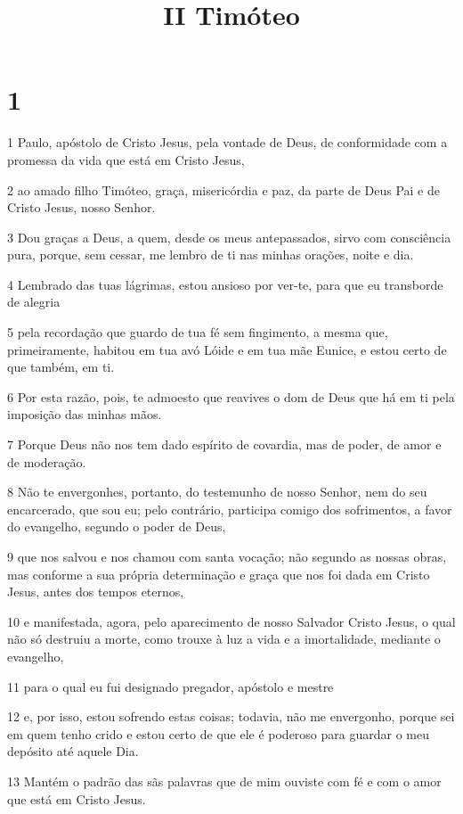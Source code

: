

\title{II Timóteo}


\chapter{1}

\par 1 Paulo, apóstolo de Cristo Jesus, pela vontade de Deus, de conformidade com a promessa da vida que está em Cristo Jesus,
\par 2 ao amado filho Timóteo, graça, misericórdia e paz, da parte de Deus Pai e de Cristo Jesus, nosso Senhor.
\par 3 Dou graças a Deus, a quem, desde os meus antepassados, sirvo com consciência pura, porque, sem cessar, me lembro de ti nas minhas orações, noite e dia.
\par 4 Lembrado das tuas lágrimas, estou ansioso por ver-te, para que eu transborde de alegria
\par 5 pela recordação que guardo de tua fé sem fingimento, a mesma que, primeiramente, habitou em tua avó Lóide e em tua mãe Eunice, e estou certo de que também, em ti.
\par 6 Por esta razão, pois, te admoesto que reavives o dom de Deus que há em ti pela imposição das minhas mãos.
\par 7 Porque Deus não nos tem dado espírito de covardia, mas de poder, de amor e de moderação.
\par 8 Não te envergonhes, portanto, do testemunho de nosso Senhor, nem do seu encarcerado, que sou eu; pelo contrário, participa comigo dos sofrimentos, a favor do evangelho, segundo o poder de Deus,
\par 9 que nos salvou e nos chamou com santa vocação; não segundo as nossas obras, mas conforme a sua própria determinação e graça que nos foi dada em Cristo Jesus, antes dos tempos eternos,
\par 10 e manifestada, agora, pelo aparecimento de nosso Salvador Cristo Jesus, o qual não só destruiu a morte, como trouxe à luz a vida e a imortalidade, mediante o evangelho,
\par 11 para o qual eu fui designado pregador, apóstolo e mestre
\par 12 e, por isso, estou sofrendo estas coisas; todavia, não me envergonho, porque sei em quem tenho crido e estou certo de que ele é poderoso para guardar o meu depósito até aquele Dia.
\par 13 Mantém o padrão das sãs palavras que de mim ouviste com fé e com o amor que está em Cristo Jesus.
